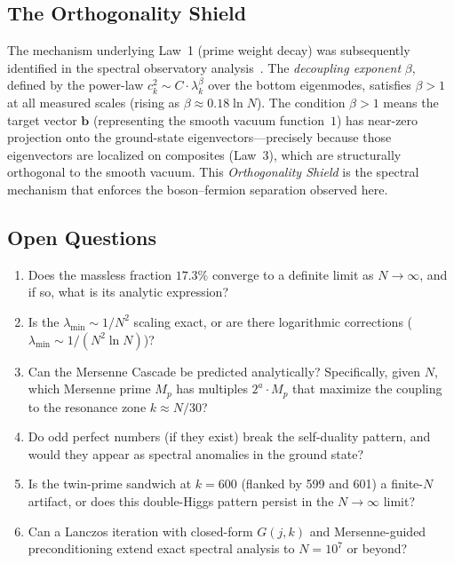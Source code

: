 \documentclass[11pt,a4paper]{article}
\begin{document}
\subsection{The Orthogonality Shield}

The mechanism underlying Law~1 (prime weight decay) was subsequently
identified in the spectral observatory analysis~\cite{cathedral-physics}.
The \emph{decoupling exponent} $\beta$, defined by the power-law
$c_k^2 \sim C \cdot \lambda_k^\beta$ over the bottom eigenmodes,
satisfies $\beta > 1$ at all measured scales (rising as
$\beta \approx 0.18 \ln N$). The condition $\beta > 1$ means the
target vector $\mathbf{b}$ (representing the smooth vacuum function~$1$)
has near-zero projection onto the ground-state eigenvectors---precisely
because those eigenvectors are localized on composites (Law~3), which
are structurally orthogonal to the smooth vacuum.
This \emph{Orthogonality Shield} is the spectral mechanism that
enforces the boson--fermion separation observed here.

\subsection{Open Questions}

\begin{enumerate}
  \item Does the massless fraction $17.3\%$ converge to a definite
    limit as $N \to \infty$, and if so, what is its analytic expression?
  \item Is the $\lambda_{\min} \sim 1/N^2$ scaling exact, or are there
    logarithmic corrections ($\lambda_{\min} \sim 1/(N^2 \ln N)$)?
  \item Can the Mersenne Cascade be predicted analytically? Specifically,
    given $N$, which Mersenne prime $M_p$ has multiples $2^a \cdot M_p$
    that maximize the coupling to the resonance zone $k \approx N/30$?
  \item Do odd perfect numbers (if they exist) break the self-duality
    pattern, and would they appear as spectral anomalies in the
    ground state?
  \item Is the twin-prime sandwich at $k = 600$ (flanked by 599 and 601)
    a finite-$N$ artifact, or does this double-Higgs pattern persist
    in the $N \to \infty$ limit?
  \item Can a Lanczos iteration with closed-form $G(j,k)$ and
    Mersenne-guided preconditioning extend exact spectral analysis
    to $N = 10^7$ or beyond?
\end{enumerate}
\end{document}
